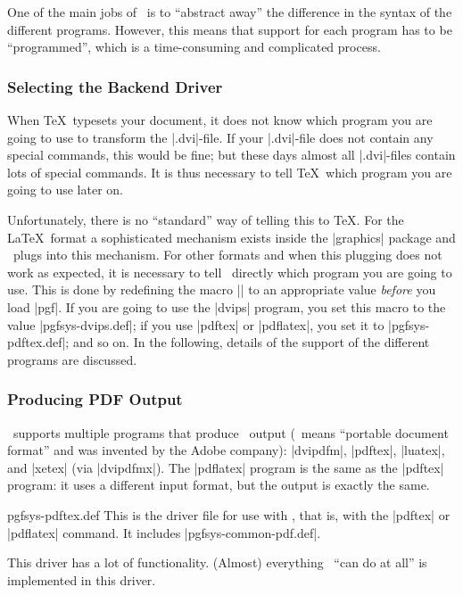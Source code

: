 One of the main jobs of \pgfname\ is to ``abstract away'' the difference in the
syntax of the different programs. However, this means that support for each
program has to be ``programmed'', which is a time-consuming and complicated
process.


\subsubsection{Selecting the Backend Driver}

When \TeX\ typesets your document, it does not know which program you are going
to use to transform the |.dvi|-file. If your |.dvi|-file does not contain any
special commands, this would be fine; but these days almost all |.dvi|-files
contain lots of special commands. It is thus necessary to tell \TeX\ which
program you are going to use later on.

Unfortunately, there is no ``standard'' way of telling this to \TeX. For the
\LaTeX\ format a sophisticated mechanism exists inside the |graphics| package
and \pgfname\ plugs into this mechanism. For other formats and when this
plugging does not work as expected, it is necessary to tell \pgfname\ directly
which program you are going to use. This is done by redefining the macro
|\pgfsysdriver| to an appropriate value \emph{before} you load |pgf|. If you
are going to use the |dvips| program, you set this macro to the value
|pgfsys-dvips.def|; if you use |pdftex| or |pdflatex|, you set it to
|pgfsys-pdftex.def|; and so on. In the following, details of the support of the
different programs are discussed.


\subsubsection{Producing PDF Output}

\pgfname\ supports multiple programs that produce \pdf\ output (\pdf\ means
``portable document format'' and was invented by the Adobe company): |dvipdfm|,
|pdftex|, |luatex|, and |xetex| (via |dvipdfmx|). The |pdflatex| program is the
same as the |pdftex| program: it uses a different input format, but the output
is exactly the same.

\begin{filedescription}{pgfsys-pdftex.def}
    This is the driver file for use with , that is, with the |pdftex| or
    |pdflatex| command. It includes |pgfsys-common-pdf.def|.

    This driver has a lot of functionality. (Almost) everything \pgfname\ ``can
    do at all'' is implemented in this driver.
\end{filedescription}


